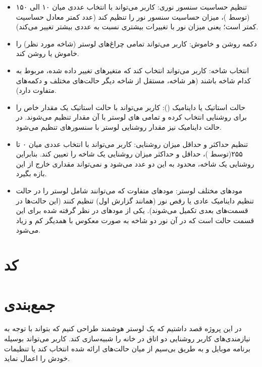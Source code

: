 \documentclass[12pt,a4paper]{article}
\begin{document}
	\begin{itemize}
		\item 
		{تنظیم حساسیت سنسور نوری:} کاربر می‌تواند با انتخاب عددی میان ۱۰ الی ۱۵۰ (توسط )، میزان حساسیت سنسور نور را تنظیم کند (عدد کمتر معادل حساسیت کمتر است؛ یعنی میزان نور با تغییرات بیشتری نسبت به عددی بیشتر تغییر می‌کند).
		\item 
		{دکمه روشن و خاموش:} کاربر می‌تواند تمامی چراغ‌های لوستر (شاخه مورد نظر) را خاموش یا روشن کند.
		\item 
		{انتخاب شاخه:} کاربر می‌تواند انتخاب کند که متغیرهای تغییر داده شده، مربوط به کدام شاخه باشند (هر شاخه، مستقل از شاخه دیگر حالت‌های مختلف و دکمه‌های متفاوت دارد).
		\item 
		{حالت استاتیک یا داینامیک ():} کاربر می‌تواند با حالت استاتیک یک مقدار خاص را برای روشنایی انتخاب کرده و تمامی  های لوستر با آن مقدار تنظیم می‌شوند. در حالت داینامیک نیز مقدار روشنایی لوستر با سنسورهای تنظیم می‌شود.
		\item 
		{تنظیم حداکثر و حداقل میزان روشنایی:} کاربر می‌تواند با انتخاب عددی میان ۰ تا ۲۵۵(توسط )، حداقل و حداکثر میزان روشنایی یک شاخه را تعیین کند. بنابراین روشنایی یک شاخه، محدود به این دو عدد می‌شود و نمی‌تواند مقداری خارج از این بازه بگیرد.
		\item 
		{مودهای مختلف لوستر:} مودهای متفاوت که می‌توانند شامل لوستر را در حالت تنظیم داینامیک عادی یا رقص نور (همانند گزارش اول) تنظیم کنند (این حالت‌ها در قسمت‌های بعدی تکمیل می‌شوند). یکی از مودهای در نظر گرفته شده برای این قسمت حالت  است که در آن نور دو شاخه به صورت معکوس با همدیگر کم و زیاد می‌شود.
		
	\end{itemize}

	\section{کد}
	
	
	
	
	\newpage
	\section*{جمع‌بندی}
در این پروژه قصد داشتیم که یک  لوستر هوشمند طراحی کنیم که بتواند با توجه به نیازمندی‌های کاربر روشنایی دو اتاق در خانه را شبیه‌سازی کند. کاربر می‌تواند بوسیله برنامه موبایل و به طریق بی‌سیم از میان حالت‌های ارائه شده انتخاب کند یا تنظیمات خودش را اعمال نماید.
	
\end{document}
